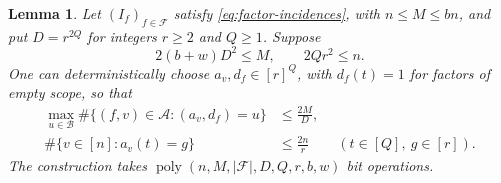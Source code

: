\documentclass[11pt,reqno]{amsart}
\numberwithin{equation}{section}
\newtheorem{lemma}[theorem]{Lemma}
\theoremstyle{definition}\newtheorem{definition}[theorem]{Definition}
\theoremstyle{remark}\newtheorem{remark}[theorem]{Remark}
\newcommand{\poly}{\operatorname{poly}}
\renewcommand{\le}{\leqslant}
\renewcommand{\ge}{\geqslant}
\begin{document}
\begin{lemma}\label{lem:incidence-labels}
Let $(I_f)_{f\in\mathcal F}$ satisfy \eqref{eq:factor-incidences},
with $n\le M\le bn$, and put $D=r^{2Q}$ for integers $r\ge2$ and
$Q\ge1$. Suppose
\begin{equation}\label{eq:incidence-balance-hypotheses}
 2(b+w)D^2\le M,\qquad 2Qr^2\le n.
\end{equation}
One can deterministically choose $a_v,d_f\in[r]^Q$, with $d_f(t)=1$
for factors of empty scope, so that
\[
 \begin{aligned}
 \max_{u\in\mathcal B}\#\{(f,v)\in\mathcal A:(a_v,d_f)=u\}
 &\le\frac{2M}{D},\\
 \#\{v\in[n]:a_v(t)=g\}&\le\frac{2n}{r}
 \qquad(t\in[Q],\ g\in[r]).
 \end{aligned}
\]
The construction takes
$\poly(n,M,|\mathcal F|,D,Q,r,b,w)$ bit operations.
\end{lemma}
\end{document}
